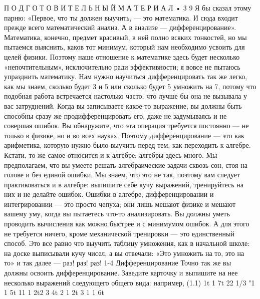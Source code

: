 \documentclass[10pt,oneside]{article}
\begin{document}
П О Д Г О Т О В И Т Е Л Ь Н Ы Й  М А Т Е Р И А Л • 3 9 Я бы сказал этому парню: «Первое, что ты должен выучить, --- это математика. И сюда входит прежде всего математический анализ. А в анализе --- дифференцирование». Математика, конечно, предмет красивый, в ней полно всяких тонкостей, но мы пытаемся выяснить, каков тот минимум, который нам необходимо усвоить для целей физики. Поэтому наше отношение к математике здесь будет несколько «непочтительным», исключительно ради эффективности; я вовсе не пытаюсь упразднить математику. Нам нужно научиться дифференцировать так же легко, как мы знаем, сколько будет 3 и 5 или сколько будет 5 умножить на 7, потому что подобная работа встречается настолько часто, что лучше бы она не вызывала у вас затруднений. Когда вы записываете какое-то выражение, вы должны быть способны сразу же продифференцировать его, даже не задумываясь и не совершая ошибок. Вы обнаружите, что эта операция требуется постоянно --- не только в физике, но и во всех науках. Поэтому дифференцирование --- это как арифметика, которую нужно было выучить перед тем, как переходить к алгебре. Кстати, то же самое относится и к алгебре: алгебры здесь много. Мы предполагаем, что вы умеете решать алгебраические задачи сквозь сон, стоя на голове и без единой ошибки. Мы знаем, что это не так, поэтому вам следует практиковаться и в алгебре: выпишите себе кучу выражений, тренируйтесь на них и не делайте ошибок. Ошибки в алгебре, дифференцировании и интегрировании --- это просто чепуха; они лишь мешают физике и мешают вашему уму, когда вы пытаетесь что-то анализировать. Вы должны уметь проводить вычисления как можно быстрее и с минимумом ошибок. А для этого не требуется ничего, кроме механической тренировки --- это единственный способ. Это все равно что выучить таблицу умножения, как в начальной школе: на доске выписывали кучу чисел, а вы отвечали: «Это умножить на то, это на то» и так далее --- раз! раз! раз! 1-4 Дифференцирование Точно так же вы должны освоить дифференцирование. Заведите карточку и выпишите на нее несколько выражений следующего общего вида: например, (1.1) 1t 1 7t 22 1/3 "1 1 5t 11 1 2t2 3 4t 2 1 2t 3 1 1 6t\par
\end{document}
